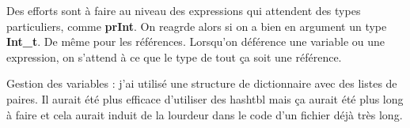 \documentclass[a4paper,10pt]{report}
\begin{document}
Des efforts sont à faire au niveau des expressions qui attendent des types particuliers, comme \textbf{prInt}. On reagrde alors si on a bien en argument un type \textbf{Int\_t}. De même pour les références. Lorsqu'on déférence une variable ou une expression, on s'attend à ce que le type de tout ça soit une référence.

Gestion des variables : j'ai utilisé une structure de dictionnaire avec des listes de paires. Il aurait été plus efficace d'utiliser des hashtbl mais ça aurait été plus long à faire et cela aurait induit de la lourdeur dans le code d'un fichier déjà très long.




\end{document}
